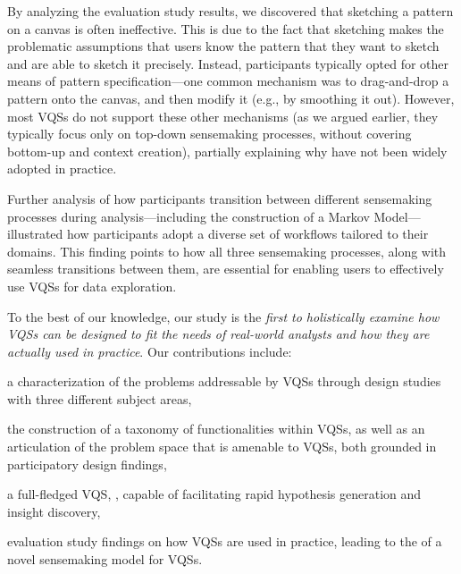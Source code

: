 \par By analyzing the evaluation study results, we discovered that sketching a pattern on a canvas is often ineffective. This is due to the fact that sketching makes the problematic assumptions that users know the pattern that they want to sketch and are able to sketch it precisely. Instead, participants typically opted for other means of pattern specification---one common mechanism was to drag-and-drop a  pattern onto the canvas, and then modify it (e.g., by smoothing it out). However, most VQSs do not support these other mechanisms (as we argued earlier, they typically focus only on top-down sensemaking processes, without covering bottom-up and context creation), partially explaining why  have not been widely adopted in practice.
\par Further analysis of how participants
transition between different sensemaking processes
during analysis---including the construction of a Markov Model---illustrated
how participants adopt a diverse set of workflows tailored
to their domains.  This finding points to how all three sensemaking processes, along with seamless transitions between them, are essential for enabling users to effectively use VQSs for data exploration.%
\par To the best of our knowledge, our study is the \emph{first to holistically examine how VQSs can be designed to fit the needs of real-world 
analysts and how they are actually used in practice}. Our contributions include: 
\begin{denselist}
\item a characterization of the problems addressable by VQSs through design studies with three different subject areas,
\item the construction of a taxonomy of functionalities within VQSs, as well as an articulation of the problem space that is amenable to VQSs, both grounded in participatory design findings,
\item a full-fledged VQS, \zvpp, capable of facilitating rapid hypothesis generation and insight discovery,
\item evaluation study findings on how VQSs are used in practice, leading to the  of a novel sensemaking model for VQSs. %
\end{denselist}

